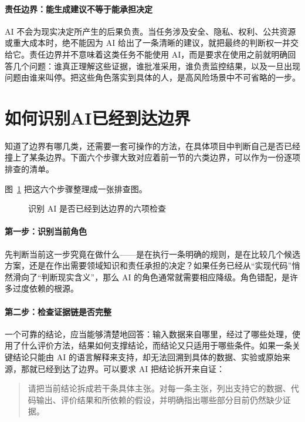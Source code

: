 \paragraph{责任边界：能生成建议不等于能承担决定}
AI 不会为现实决定所产生的后果负责。当任务涉及安全、隐私、权利、公共资源或重大成本时，绝不能因为 AI 给出了一条清晰的建议，就把最终的判断权一并交给它。责任边界并不意味着这类任务不能使用 AI，而是要求在使用之前就明确回答几个问题：谁真正理解这些证据，谁批准采用，谁负责监控结果，以及一旦出现问题由谁来叫停。把这些角色落实到具体的人，是高风险场景中不可省略的一步。

\section{如何识别AI已经到达边界}

知道了边界有哪几类，还需要一套可操作的方法，在具体项目中判断自己是否已经撞上了某条边界。下面六个步骤大致对应着前一节的六类边界，可以作为一份逐项排查的清单。

图~\ref{fig:ch14_identify} 把这六个步骤整理成一张排查图。

\begin{figure}[H]
  \centering
  \caption{识别 AI 是否已经到达边界的六项检查}
  \label{fig:ch14_identify}
\end{figure}

\paragraph{第一步：识别当前角色}
先判断当前这一步究竟在做什么——是在执行一条明确的规则，是在比较几个候选方案，还是在作出需要领域知识和责任承担的决定？如果任务已经从“实现代码”悄然滑向了“判断现实含义”，那么 AI 的角色通常就需要相应降级。角色错配，是许多过度依赖的根源。

\paragraph{第二步：检查证据链是否完整}
一个可靠的结论，应当能够清楚地回答：输入数据来自哪里，经过了哪些处理，使用了什么评价方法，结果如何支撑结论，而结论又只适用于哪些条件。如果一条关键结论只能由 AI 的语言解释来支持，却无法回溯到具体的数据、实验或原始来源，那就已经到达了边界。可以要求 AI 把结论拆开来自证：

\begin{quote}
请把当前结论拆成若干条具体主张。对每一条主张，列出支持它的数据、代码输出、评价结果和所依赖的假设，并明确指出哪些部分目前仍然缺少证据。
\end{quote}

